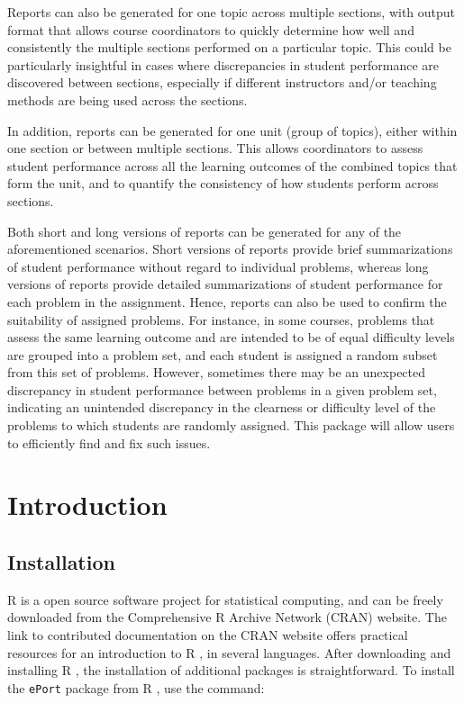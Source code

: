 \documentclass{article}\usepackage[]{graphicx}\usepackage[]{color}
\numberwithin{equation}{section} %
\newcommand{\pkg}[1]{{\texttt{#1}}}
\newcommand{\R}{{\normalfont\textsf{R }}{}}
\begin{document}
Reports can also be generated for one topic across multiple sections, with output format that allows course coordinators to quickly determine how well and consistently the multiple sections performed on a particular topic. This could be particularly insightful in cases where discrepancies in student performance are discovered between sections, especially if different instructors and/or teaching methods are being used across the sections.

In addition, reports can be generated for one unit (group of topics), either within one section or between multiple sections. This allows coordinators to assess student performance across all the learning outcomes of the combined topics that form the unit, and to quantify the consistency of how students perform across sections.

Both short and long versions of reports can be generated for any of the aforementioned scenarios. Short versions of reports provide brief summarizations of student performance without regard to individual problems, whereas long versions of reports provide detailed summarizations of student performance for each problem in the assignment. Hence, reports can also be used to confirm the suitability of assigned problems. For instance, in some courses, problems that assess the same learning outcome and are intended to be of equal difficulty levels are grouped into a problem set, and each student is assigned a random subset from this set of problems. However, sometimes there may be an unexpected discrepancy in student performance between problems in a given problem set, indicating an unintended discrepancy in the clearness or difficulty level of the problems to which students are randomly assigned. This package will allow users to efficiently find and fix such issues. 

\bigskip

\section{Introduction}

\subsection{Installation}

\R is a open source software project for statistical computing, and can be freely downloaded from the Comprehensive R Archive Network (CRAN) website. The link to contributed documentation on the CRAN website offers practical resources for an introduction to \R, in several languages. After downloading and installing \R, the installation of additional packages is straightforward. To install the \pkg{ePort} package from \R, use the command:
\end{document}

